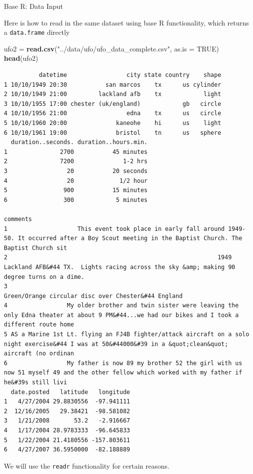 \documentclass[
  ignorenonframetext,
]{beamer}
\newenvironment{Shaded}{\begin{snugshade}}{\end{snugshade}}
\newcommand{\DataTypeTok}[1]{\textcolor[rgb]{0.13,0.29,0.53}{#1}}
\newcommand{\KeywordTok}[1]{\textcolor[rgb]{0.13,0.29,0.53}{\textbf{#1}}}
\newcommand{\NormalTok}[1]{#1}
\newcommand{\OtherTok}[1]{\textcolor[rgb]{0.56,0.35,0.01}{#1}}
\newcommand{\StringTok}[1]{\textcolor[rgb]{0.31,0.60,0.02}{#1}}
\begin{document}
\begin{frame}[fragile]{Base R: Data Input}
\protect\hypertarget{base-r-data-input-1}{}

Here is how to read in the same dataset using base R functionality,
which returns a \texttt{data.frame} directly

\begin{Shaded}
\begin{Highlighting}[]
\NormalTok{ufo2 =}\StringTok{ }\KeywordTok{read.csv}\NormalTok{(}\StringTok{"../data/ufo/ufo_data_complete.csv"}\NormalTok{, }\DataTypeTok{as.is =} \OtherTok{TRUE}\NormalTok{)}
\KeywordTok{head}\NormalTok{(ufo2)}
\end{Highlighting}
\end{Shaded}

\begin{verbatim}
          datetime                 city state country    shape
1 10/10/1949 20:30           san marcos    tx      us cylinder
2 10/10/1949 21:00         lackland afb    tx            light
3 10/10/1955 17:00 chester (uk/england)            gb   circle
4 10/10/1956 21:00                 edna    tx      us   circle
5 10/10/1960 20:00              kaneohe    hi      us    light
6 10/10/1961 19:00              bristol    tn      us   sphere
  duration..seconds. duration..hours.min.
1               2700           45 minutes
2               7200              1-2 hrs
3                 20           20 seconds
4                 20             1/2 hour
5                900           15 minutes
6                300            5 minutes
                                                                                                                                                    comments
1                    This event took place in early fall around 1949-50. It occurred after a Boy Scout meeting in the Baptist Church. The Baptist Church sit
2                                                            1949 Lackland AFB&#44 TX.  Lights racing across the sky &amp; making 90 degree turns on a dime.
3                                                                                                        Green/Orange circular disc over Chester&#44 England
4                 My older brother and twin sister were leaving the only Edna theater at about 9 PM&#44...we had our bikes and I took a different route home
5 AS a Marine 1st Lt. flying an FJ4B fighter/attack aircraft on a solo night exercise&#44 I was at 50&#44000&#39 in a &quot;clean&quot; aircraft (no ordinan
6                 My father is now 89 my brother 52 the girl with us now 51 myself 49 and the other fellow which worked with my father if he&#39s still livi
  date.posted   latitude   longitude
1   4/27/2004 29.8830556  -97.941111
2  12/16/2005   29.38421  -98.581082
3   1/21/2008       53.2   -2.916667
4   1/17/2004 28.9783333  -96.645833
5   1/22/2004 21.4180556 -157.803611
6   4/27/2007 36.5950000  -82.188889
\end{verbatim}

We will use the \texttt{readr} functionality for certain reasons.

\end{frame}
\end{document}

